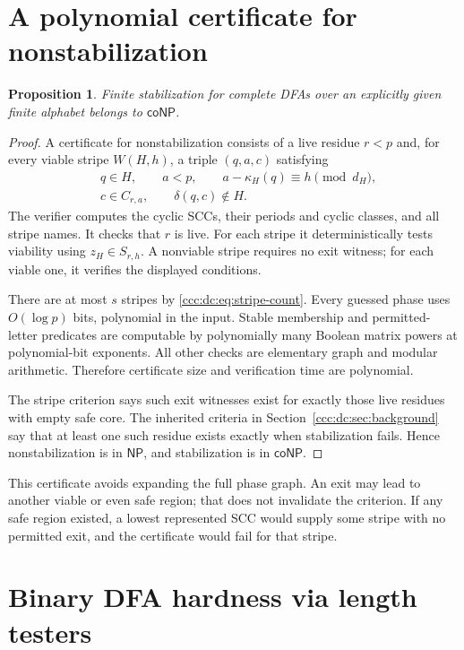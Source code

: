 \documentclass[11pt,letterpaper]{article}
\newtheorem{proposition}[theorem]{Proposition}
\theoremstyle{definition}
\theoremstyle{remark}
\newcommand{\NP}{\mathsf{NP}}
\newcommand{\coNP}{\mathsf{coNP}}
\begin{document}
\section{A polynomial certificate for nonstabilization}\label{ccc:dc:sec:upper}

\begin{proposition}\label{ccc:dc:prop:conp}
Finite stabilization for complete DFAs over an explicitly given finite alphabet belongs to $\coNP$.
\end{proposition}
\begin{proof}
A certificate for nonstabilization consists of a live residue $r<p$ and, for every viable stripe $W(H,h)$, a triple $(q,a,c)$ satisfying
\begin{align*}
&q\in H,\qquad a<p,\qquad a-\kappa_H(q)\equiv h\pmod{d_H},\\
&c\in C_{r,a},\qquad \delta(q,c)\notin H.
\end{align*}
The verifier computes the cyclic SCCs, their periods and cyclic classes, and all stripe names. It checks that $r$ is live. For each stripe it deterministically tests viability using $z_H\in S_{r,h}$. A nonviable stripe requires no exit witness; for each viable one, it verifies the displayed conditions.

There are at most $s$ stripes by \eqref{ccc:dc:eq:stripe-count}. Every guessed phase uses $O(\log p)$ bits, polynomial in the input. Stable membership and permitted-letter predicates are computable by polynomially many Boolean matrix powers at polynomial-bit exponents. All other checks are elementary graph and modular arithmetic. Therefore certificate size and verification time are polynomial.

The stripe criterion says such exit witnesses exist for exactly those live residues with empty safe core. The inherited criteria in Section~\ref{ccc:dc:sec:background} say that at least one such residue exists exactly when stabilization fails. Hence nonstabilization is in $\NP$, and stabilization is in $\coNP$.
\end{proof}

This certificate avoids expanding the full phase graph. An exit may lead to another viable or even safe region; that does not invalidate the criterion. If any safe region existed, a lowest represented SCC would supply some stripe with no permitted exit, and the certificate would fail for that stripe.

\section{Binary DFA hardness via length testers}\label{ccc:dc:sec:hardness}
\end{document}
